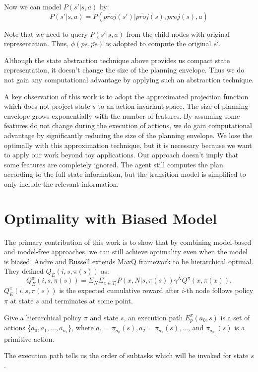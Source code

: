 Now we can model $P(s'|s, a)$ by:
\begin{equation}
    P(s'|s, a) = P(\bar{proj}(s')| \bar{proj}(s), proj(s), a)
\end{equation}

Note that we need to query $P(s'|s, a)$ from the child nodes with original representation.
Thus, $\phi(ps, \bar{ps})$ is adopted to compute the original $s'$.  

Although the state abstraction technique above provides us compact state representation, 
it doesn't change the size of the planning envelope. Thus we do not gain any computational
advantage by applying such an abstraction technique.

A key observation of this work is to adopt the approximated projection function which
does not project state $s$ to an action-invariant space.
The size of planning envelope grows exponentially with the number of features.
By assuming 
some features do not change during the execution of actions, we do gain computational advantage by
significantly reducing the size of the planning envelope. 
We lose the optimally with this approximation technique, but it is necessary because we want 
to apply our work beyond toy applications.
Our approach doesn't imply that
some features are completely ignored. The agent still computes the plan according to 
the full state information, but the transition model is simplified to only include the 
relevant information.

\section{Optimality with Biased Model}
The primary contribution of this work is to show that by combining model-based and 
model-free approaches, we can still achieve optimality even when the model is biased.
Andre and Russell \cite{OptimalQ} extends MaxQ framework to be hierarchical optimal.
They defined $Q_E(i, s, \pi(s))$ as:
\begin{equation}
    Q_E^{\pi}(i, s, \pi(s)) = \Sigma_N \Sigma_{x \in T_i}P(x, N| s, \pi(s)) \gamma^N Q^{\pi}(x, \pi(x)).
    \label{eq:QE}
\end{equation}
$Q_E^{\pi}(i, s, \pi(s))$ is the expected cumulative reward after $i$-th node follows 
policy $\pi$ at state $s$ and terminates at some point.

\begin{definition}
    Give a hierarchical policy $\pi$ and state $s$, an execution path $E_p^\pi(a_0, s)$ 
    is a set of actions $\{a_0, a_1, \dots, a_{n_1}\}$, where $a_1=\pi_{a_0}(s), a_2=\pi_{a_1}(s), \dots$,
    and $\pi_{a_{n_1}}(s)$ is a primitive action.
\end{definition}
The execution path tells us the order of subtasks which will be invoked for state $s$.


